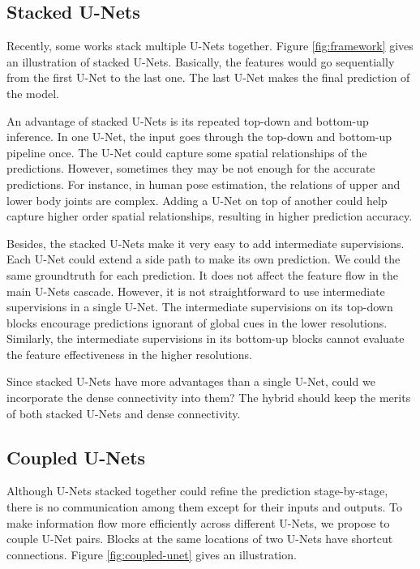 \documentclass{bmvc2k}
\begin{document}
\subsection{Stacked U-Nets}
Recently, some works \cite{newell2016stacked,wei2016convolutional}  stack multiple U-Nets together. Figure \ref{fig:framework} gives an illustration of stacked U-Nets. Basically, the features would go sequentially from the first U-Net to the last one. The last U-Net makes the final prediction of the model. 

An advantage of stacked U-Nets is its repeated top-down and bottom-up inference. In one U-Net, the input goes through the top-down and bottom-up pipeline once. The U-Net could capture some spatial relationships of the predictions. However, sometimes they may be not enough for the accurate predictions. For instance, in human pose estimation, the relations of upper and lower body joints are complex. Adding a U-Net on top of another could help capture higher order spatial relationships, resulting in higher prediction accuracy.

Besides, the stacked U-Nets make it very easy to add intermediate supervisions. Each U-Net could extend a side path to make its own prediction. We could the same groundtruth for each prediction. It does not affect the feature flow in the main U-Nets cascade. However, it is not straightforward to use intermediate supervisions in a single U-Net. The intermediate supervisions on its top-down blocks encourage predictions ignorant of global cues in the lower resolutions. Similarly, the intermediate supervisions in its bottom-up blocks cannot evaluate the feature effectiveness in the higher resolutions. 

Since stacked U-Nets have more advantages than a single U-Net, could we incorporate the dense connectivity into them? The hybrid should keep the merits of both stacked U-Nets and dense connectivity.

\subsection{Coupled U-Nets}
Although U-Nets stacked together could refine the prediction stage-by-stage, there is no communication among them except for their inputs and outputs. To make information flow more efficiently across different U-Nets, we propose to couple U-Net pairs. Blocks at the same locations of two U-Nets have shortcut connections. Figure \ref{fig:coupled-unet} gives an illustration. 
\end{document}

